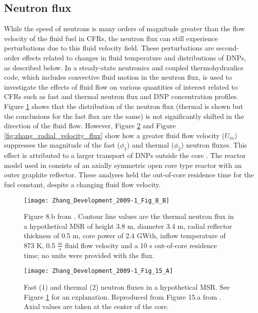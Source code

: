 \documentclass[review]{elsarticle}
\begin{document}
\subsection{Neutron flux} \label{ssec:flux}
While the speed of neutrons is many orders of magnitude greater than
the flow velocity of the fluid fuel in CFRs, the neutron flux can still experience
perturbations due to this fluid velocity field. These perturbations are 
second-order effects related to changes in fluid temperature and distributions of
 DNPs, as described below. In \cite{zhang_development_2009-1}
 a steady-state neutronics and coupled thermohydraulics code, which includes convective
fluid motion in the neutron flux, is used to investigate the effects of fluid
flow on various quantities of interest related to CFRs such as fast and thermal
neutron flux and DNP concentration profiles. 
Figure \ref{fig:zhang_2d_flux} shows that the
distribution of the neutron flux (thermal is shown but the conclusions for 
the fast flux are the same) is not significantly shifted in the direction
of the fluid flow. However, Figure \ref{fig:zhang_axial_velocity_flux} and
Figure \ref{fig:zhang_radial_velocity_flux} show how a greater fluid flow
 velocity ($U_{in}$) suppresses the magnitude of the fast
 ($\phi_{1}$) and thermal ($\phi_{2}$) neutron fluxes. This effect is
 attributed to a larger transport of DNPs outside
 the core \cite{zhang_development_2009-1}. The reactor model
 used in \cite{zhang_development_2009-1} consists of an axially symmetric
 open core type reactor with an outer graphite reflector. These analyses held the
 out-of-core residence time for the fuel constant, despite a changing
 fluid flow velocity.

\begin{figure}[H]
   \centering
   \texttt{[image: Zhang\_Development\_2009-1\_Fig\_8\_B]}
   \caption{Figure 8.b from \cite{zhang_development_2009-1}. Contour line
    values are the thermal neutron flux in a hypothetical MSR of height 3.8 m, diameter 3.4 m,
    radial reflector thickness of 0.5 m, core power of 2.4 GWth, inflow temperature of 873 K,
    0.5 $\frac{m}{s}$ fluid flow
    velocity and a 10 s out-of-core residence time; no units were provided with the flux.} 
   \label{fig:zhang_2d_flux}
\end{figure}

\begin{figure}[H]
   \centering
   \texttt{[image: Zhang\_Development\_2009-1\_Fig\_15\_A]}
   \caption{Fast (1) and thermal (2) neutron fluxes in a hypothetical MSR. See Figure 
            \ref{fig:zhang_2d_flux} for an explanation. Reproduced from Figure 15.a from
            \cite{zhang_development_2009-1}. 
               Axial
               values are taken at the center of the core.}
   \label{fig:zhang_axial_velocity_flux}
\end{figure}
\end{document}
